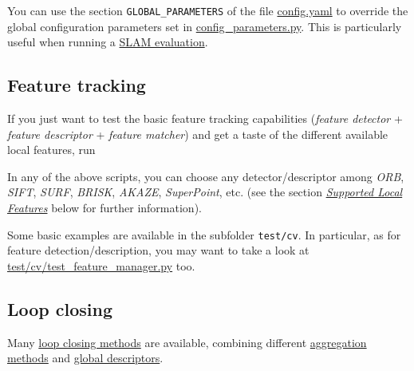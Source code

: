 \documentclass{article}
\newenvironment{Shaded}{\begin{snugshade}}{\end{snugshade}}
\newcommand{\BuiltInTok}[1]{\textcolor[rgb]{0.74,0.68,0.62}{#1}}
\newcommand{\CommentTok}[1]{\textcolor[rgb]{0.00,0.40,1.00}{\textbf{\textit{#1}}}}
\newcommand{\ExtensionTok}[1]{\textcolor[rgb]{0.74,0.68,0.62}{#1}}
\newcommand{\NormalTok}[1]{\textcolor[rgb]{0.74,0.68,0.62}{#1}}
\begin{document}
You can use the section \texttt{GLOBAL\_PARAMETERS} of the file
\href{./config.yaml}{config.yaml} to override the global configuration
parameters set in \href{./config_parameters.py}{config\_parameters.py}.
This is particularly useful when running a
\protect\hyperlink{evaluating-slam}{SLAM evaluation}.

\hypertarget{feature-tracking}{%
\subsection{Feature tracking}\label{feature-tracking}}

If you just want to test the basic feature tracking capabilities
(\emph{feature detector} + \emph{feature descriptor} + \emph{feature
matcher}) and get a taste of the different available local features, run \\

\begin{scriptsize}
\begin{Shaded}
\end{Shaded}
\end{scriptsize}


In any of the above scripts, you can choose any detector/descriptor
among \emph{ORB}, \emph{SIFT}, \emph{SURF}, \emph{BRISK}, \emph{AKAZE},
\emph{SuperPoint}, etc. (see the section
\emph{\protect\hyperlink{supported-local-features}{Supported Local
Features}} below for further information).

Some basic examples are available in the subfolder
\texttt{test/cv}. In particular, as for feature
detection/description, you may want to take a look at
\href{./test/cv/test_feature_manager.py}{test/cv/test\_feature\_manager.py}
too.

\hypertarget{loop-closing}{%
\subsection{Loop closing}\label{loop-closing}}

Many \protect\hyperlink{loop-closing}{loop closing methods} are
available, combining different
\protect\hyperlink{local-descriptor-aggregation-methods}{aggregation
methods} and \protect\hyperlink{global-descriptors}{global descriptors}.
\end{document}
